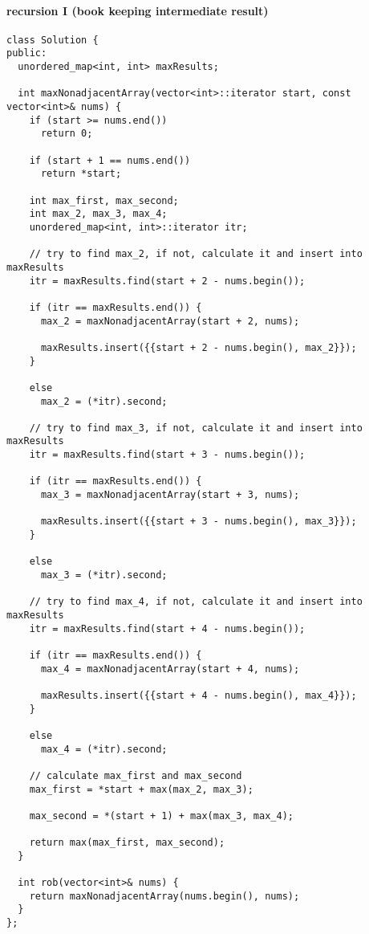 \documentclass[12pt]{article}
\begin{document}
\paragraph{recursion I (book keeping intermediate result)}
\label{sec:org99c3fd9}
\begin{verbatim}
class Solution {
public:
  unordered_map<int, int> maxResults;

  int maxNonadjacentArray(vector<int>::iterator start, const vector<int>& nums) {
    if (start >= nums.end())
      return 0;

    if (start + 1 == nums.end())
      return *start;

    int max_first, max_second;
    int max_2, max_3, max_4;
    unordered_map<int, int>::iterator itr;

    // try to find max_2, if not, calculate it and insert into maxResults
    itr = maxResults.find(start + 2 - nums.begin());

    if (itr == maxResults.end()) {
      max_2 = maxNonadjacentArray(start + 2, nums);

      maxResults.insert({{start + 2 - nums.begin(), max_2}});
    }

    else
      max_2 = (*itr).second;

    // try to find max_3, if not, calculate it and insert into maxResults
    itr = maxResults.find(start + 3 - nums.begin());

    if (itr == maxResults.end()) {
      max_3 = maxNonadjacentArray(start + 3, nums);

      maxResults.insert({{start + 3 - nums.begin(), max_3}});
    }

    else
      max_3 = (*itr).second;

    // try to find max_4, if not, calculate it and insert into maxResults
    itr = maxResults.find(start + 4 - nums.begin());

    if (itr == maxResults.end()) {
      max_4 = maxNonadjacentArray(start + 4, nums);

      maxResults.insert({{start + 4 - nums.begin(), max_4}});
    }

    else
      max_4 = (*itr).second;

    // calculate max_first and max_second 
    max_first = *start + max(max_2, max_3);

    max_second = *(start + 1) + max(max_3, max_4);

    return max(max_first, max_second);
  }

  int rob(vector<int>& nums) {
    return maxNonadjacentArray(nums.begin(), nums);
  }
};
\end{verbatim}
\end{document}
